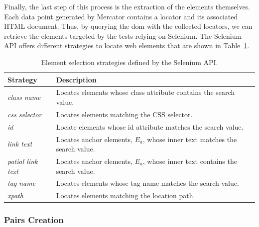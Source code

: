 Finally, the last step of this process is the extraction of the elements themselves. Each data point generated by Mercator contains a locator and its associated HTML document. Thus, by querying the \gls{dom} with the collected locators, we can retrieve the elements targeted by the tests relying on Selenium. The Selenium API offers different strategies to locate web elements that are shown in Table~\ref{tab:selenium_strategies}. 

\begin{table}
\centering
\caption{Element selection strategies defined by the Selenium API.}
\label{tab:selenium_strategies}
\begin{tabular}{>{\raggedright}m{1in}>{\raggedright}m{3in}}
\toprule
\textbf{\scriptsize{Strategy}} & \textbf{\scriptsize{Description}}\tabularnewline
\toprule
\scriptsize{\textit{class name}} & \scriptsize{Locates elements whose class attribute contains the search value.} \tabularnewline
\scriptsize{\textit{css selector}} & \scriptsize{Locates elements matching the CSS selector.} \tabularnewline
\scriptsize{\textit{id}} & \scriptsize{Locate elements whose id attribute matches the search value.} \tabularnewline
\scriptsize{\textit{link text}} & \scriptsize{Locates anchor elements, $E_a$, whose inner text matches the search value.} \tabularnewline
\scriptsize{\textit{patial link text}} & \scriptsize{Locates anchor elements, $E_a$, whose inner text contains the search value.} \tabularnewline
\scriptsize{\textit{tag name}} & \scriptsize{Locates elements whose tag name matches the search value.} \tabularnewline
\scriptsize{\textit{xpath}} & \scriptsize{Locates elements matching the location path.} \tabularnewline
\bottomrule
\end{tabular}
\end{table}

\subsubsection{Pairs Creation}
\label{sec:hpath-protocol-pairs}

